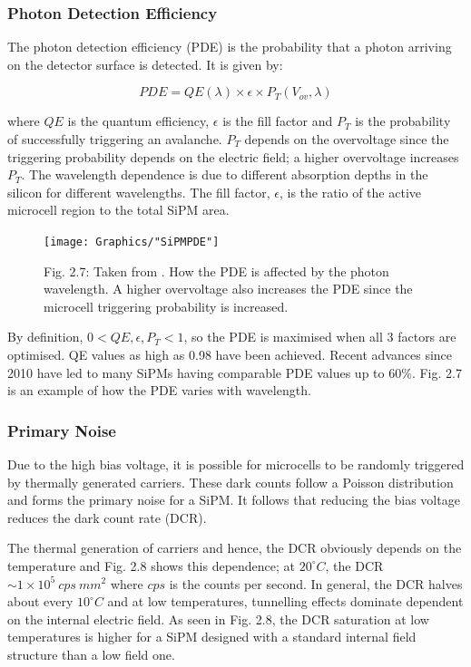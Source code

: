 \subsubsection{Photon Detection Efficiency}

The photon detection efficiency (PDE) is the probability that a photon arriving on the detector surface is detected. It is given by:

\[
  PDE= QE(\lambda) \times \epsilon \times P_{T}(V_{ov},\lambda) \tag{2.5}
\]

\noindent where $QE$ is the quantum efficiency, \(\epsilon\) is the fill factor and \(P_{T}\) is the probability of successfully triggering an avalanche. \(P_{T}\) depends on the overvoltage since the triggering probability depends on the electric field; a higher overvoltage increases \(P_{T}\). The wavelength dependence is due to different absorption depths in the silicon for different wavelengths. The fill factor, $\epsilon$, is the ratio of the active microcell region to the total SiPM area. \cite{acerbi2019}

\begin{figure}[h]
\texttt{[image: Graphics/"SiPMPDE"]}
  {\caption*{Fig. 2.7: Taken from \cite{sensl2011}. How the PDE is affected by the photon wavelength. A higher overvoltage also increases the PDE since the microcell triggering probability is increased.}}
\end{figure}

\noindent By definition, \(0< QE, \epsilon, P_{T} <1\), so the PDE is maximised when all 3 factors are optimised. QE values as high as 0.98 have been achieved. \cite{firstsensor} Recent advances since 2010 have led to many SiPMs having comparable PDE values up to $60\%$. \cite{gundacker2020} Fig. 2.7 is an example of how the PDE varies with wavelength.

\subsubsection{Primary Noise}

Due to the high bias voltage, it is possible for microcells to be randomly triggered by thermally generated carriers. These dark counts follow a Poisson distribution and forms the primary noise for a SiPM. \cite{cova1996} It follows that reducing the bias voltage reduces the dark count rate (DCR).

The thermal generation of carriers and hence, the DCR obviously depends on the temperature and Fig. 2.8 shows this dependence; at $20^\circ C$, the DCR $\sim 1\times 10^5 \ cps \ mm^2$ where $cps$ is the counts per second. In general, the DCR halves about every $10^\circ C$ and at low temperatures, tunnelling effects dominate dependent on the internal electric field. As seen in Fig. 2.8, the DCR saturation at low temperatures is higher for a SiPM designed with a standard internal field structure than a low field one. \cite{acerbi2017}

